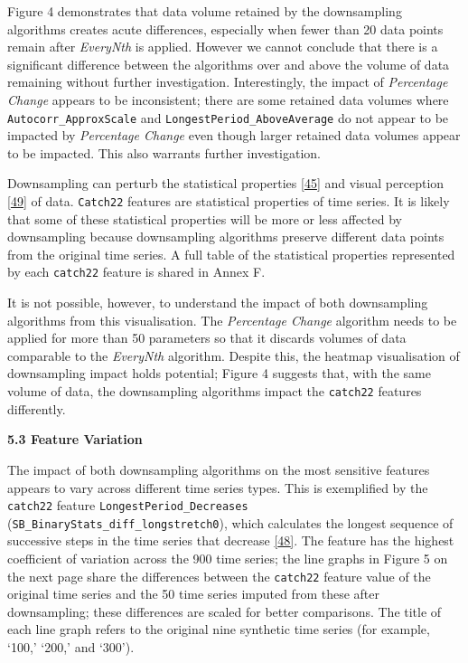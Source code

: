\documentclass{article}
\begin{document}
Figure 4 demonstrates that data volume retained by the downsampling
algorithms creates acute differences, especially when fewer than 20 data
points remain after \emph{EveryNth} is applied. However we cannot
conclude that there is a significant difference between the algorithms
over and above the volume of data remaining without further
investigation. Interestingly, the impact of \emph{Percentage Change}
appears to be inconsistent; there are some retained data volumes where
\texttt{Autocorr\_ApproxScale} and \texttt{LongestPeriod\_AboveAverage}
do not appear to be impacted by \emph{Percentage Change} even though
larger retained data volumes appear to be impacted. This also warrants
further investigation.

Downsampling can perturb the statistical properties
\protect\hyperlink{ref-ATIChangePoint}{{[}45{]}} and visual perception
\protect\hyperlink{ref-graphsampling}{{[}49{]}} of data.
\texttt{Catch22} features are statistical properties of time series. It
is likely that some of these statistical properties will be more or less
affected by downsampling because downsampling algorithms preserve
different data points from the original time series. A full table of the
statistical properties represented by each \texttt{catch22} feature is
shared in Annex F.

It is not possible, however, to understand the impact of both
downsampling algorithms from this visualisation. The \emph{Percentage
Change} algorithm needs to be applied for more than 50 parameters so
that it discards volumes of data comparable to the \emph{EveryNth}
algorithm. Despite this, the heatmap visualisation of downsampling
impact holds potential; Figure 4 suggests that, with the same volume of
data, the downsampling algorithms impact the \texttt{catch22} features
differently.

\textbf{5.3 Feature Variation}

The impact of both downsampling algorithms on the most sensitive
features appears to vary across different time series types. This is
exemplified by the \texttt{catch22} feature
\texttt{LongestPeriod\_Decreases}
(\texttt{SB\_BinaryStats\_diff\_longstretch0}), which calculates the
longest sequence of successive steps in the time series that decrease
\protect\hyperlink{ref-feature_book}{{[}48{]}}. The feature has the
highest coefficient of variation across the 900 time series; the line
graphs in Figure 5 on the next page share the differences between the
\texttt{catch22} feature value of the original time series and the 50
time series imputed from these after downsampling; these differences are
scaled for better comparisons. The title of each line graph refers to
the original nine synthetic time series (for example, `100,' `200,' and
`300').
\end{document}
